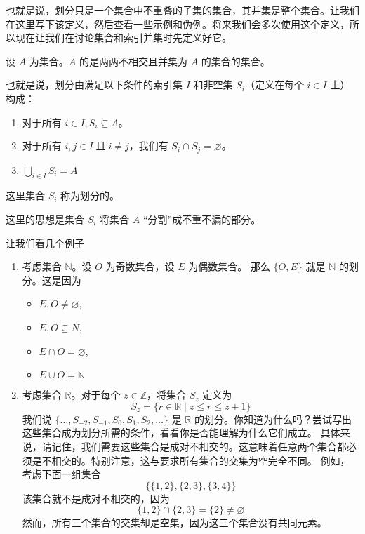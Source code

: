 也就是说，划分只是一个集合中不重叠的子集的集合，其并集是整个集合。让我们在这里写下该定义，然后查看一些示例和伪例。将来我们会多次使用这个定义，所以现在让我们在讨论集合和索引并集时先定义好它。

\begin{definition}
    设 $A$ 为集合。$A$ 的是两两不相交且并集为 $A$ 的集合的集合。

    也就是说，划分由满足以下条件的索引集 $I$ 和非空集 $S_i$（定义在每个 $i \in I$ 上）构成：
    \begin{enumerate}[label=(\arabic*)]
        \item 对于所有 $i \in I, S_i \subseteq A$。
        \item 对于所有 $i, j \in I \;\text{且}\; i \ne j$，我们有 $S_i \cap S_j = \varnothing$。
        \item $\bigcup_{i \in I} S_i = A$
    \end{enumerate}
    这里集合 $S_i$ 称为划分的。
\end{definition}

这里的思想是集合 $S_i$ 将集合 $A$ ``分割''成不重不漏的部分。

\begin{example}
    让我们看几个例子
    \begin{enumerate}[label=(\arabic*)]
        \item 考虑集合 $\mathbb{N}$。设 $O$ 为奇数集合，设 $E$ 为偶数集合。 那么 $\{O, E\}$ 就是 $\mathbb{N}$ 的划分。这是因为
        \begin{itemize}
            \item $E, O \ne \varnothing$,
            \item $E, O \subseteq N$,
            \item $E \cap O = \varnothing$,
            \item $E \cup O = \mathbb{N}$ 
        \end{itemize}
        \item 考虑集合 $\mathbb{R}$。对于每个 $z \in \mathbb{Z}$，将集合 $S_z$ 定义为
        \[S_z = \{r \in \mathbb{R} \mid z \le r \le z + 1\}\]
        我们说 $\{\dots, S_{-2}, S_{-1}, S_0, S_1, S_2, \dots \}$ 是 $\mathbb{R}$ 的划分。你知道为什么吗？尝试写出这些集合成为划分所需的条件，看看你是否能理解为什么它们成立。
        具体来说，请记住，我们需要这些集合是成对不相交的。这意味着任意两个集合都必须是不相交的。特别注意，这与要求所有集合的交集为空完全不同。
        例如，考虑下面一组集合
        \[\big\{\{1, 2\}, \{2, 3\}, \{3, 4\}\big\}\]
        该集合就不是成对不相交的，因为
        \[\{1, 2\} \cap \{2, 3\} = \{2\} \ne \varnothing\]
        然而，所有三个集合的交集却是空集，因为这三个集合没有共同元素。
    \end{enumerate}
\end{example}

